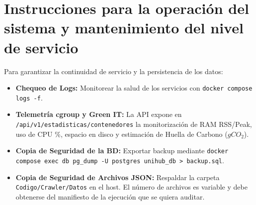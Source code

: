 \section{Instrucciones para la operación del sistema y mantenimiento del nivel de servicio}
Para garantizar la continuidad de servicio y la persistencia de los datos:
\begin{itemize}
    \item \textbf{Chequeo de Logs:} Monitorear la salud de los servicios con \texttt{docker compose logs -f}.
    \item \textbf{Telemetría cgroup y Green IT:} La API expone en \texttt{/api/v1/estadisticas/contenedores} la monitorización de RAM RSS/Peak, uso de CPU \%, espacio en disco y estimación de Huella de Carbono ($gCO_2$).
    \item \textbf{Copia de Seguridad de la BD:} Exportar backup mediante \texttt{docker compose exec db pg\_dump -U postgres unihub\_db > backup.sql}.
    \item \textbf{Copia de Seguridad de Archivos JSON:} Respaldar la carpeta \texttt{Codigo/Crawler/Datos} en el host. El número de archivos es variable y debe obtenerse del manifiesto de la ejecución que se quiera auditar.
\end{itemize}
